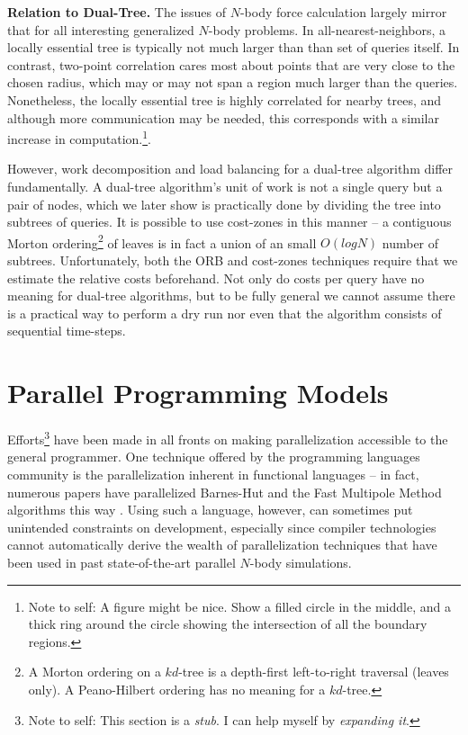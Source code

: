 \documentclass[times, leqno,twocolumn]{article}
\newcommand{\authornote}[1]{\footnote{Note to self: #1}}
\begin{document}
{\bf Relation to Dual-Tree.}
The issues of $N$-body force calculation largely mirror that for all interesting generalized $N$-body problems.
In all-nearest-neighbors, a locally essential tree is typically not much larger than than set of queries itself.
In contrast, two-point correlation cares most about points that are very close to the chosen radius, which may or may not span a region much larger than the queries.
Nonetheless, the locally essential tree is highly correlated for nearby trees, and although more communication may be needed, this corresponds with a similar increase in computation.\authornote{A figure might be nice.  Show a filled circle in the middle, and a thick ring around the circle showing the intersection of all the boundary regions.}.

However, work decomposition and load balancing for a dual-tree algorithm differ fundamentally.
A dual-tree algorithm's unit of work is not a single query but a pair of nodes, which we later show is practically done by dividing the tree into subtrees of queries.
It is possible to use cost-zones in this manner -- a contiguous Morton ordering\footnote{A Morton ordering on a $kd$-tree is a depth-first left-to-right traversal (leaves only).  A Peano-Hilbert ordering has no meaning for a $kd$-tree.} of leaves is in fact a union of an small $O(log N)$ number of subtrees.
Unfortunately, both the ORB and cost-zones techniques require that we estimate the relative costs beforehand.
Not only do costs per query have no meaning for dual-tree algorithms, but to be fully general we cannot assume there is a practical way to perform a dry run nor even that the algorithm consists of sequential time-steps.

\section{Parallel Programming Models}

Efforts\authornote{This section is a {\it stub}. I can help myself by {\it expanding it}.} have been made in all fronts on making parallelization accessible to the general programmer.
One technique offered by the programming languages community is the parallelization inherent in functional languages -- in fact, numerous papers have parallelized Barnes-Hut and the Fast Multipole Method algorithms this way \cite{nesl, parallel_fmm}.
Using such a language, however, can sometimes put unintended constraints on development, especially since compiler technologies cannot automatically derive the wealth of parallelization techniques that have been used in past state-of-the-art parallel $N$-body simulations.
\end{document}
